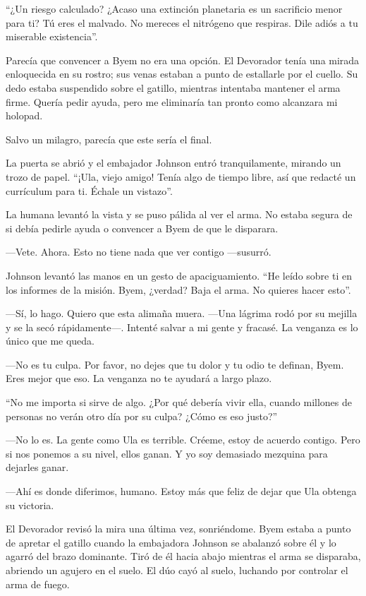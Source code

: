 ``¿Un riesgo calculado? ¿Acaso una extinción planetaria es un sacrificio menor para ti? Tú eres el malvado. No mereces el nitrógeno que respiras. Dile adiós a tu miserable existencia''.

Parecía que convencer a Byem no era una opción. El Devorador tenía una mirada enloquecida en su rostro; sus venas estaban a punto de estallarle por el cuello. Su dedo estaba suspendido sobre el gatillo, mientras intentaba mantener el arma firme. Quería pedir ayuda, pero me eliminaría tan pronto como alcanzara mi holopad.

Salvo un milagro, parecía que este sería el final.

La puerta se abrió y el embajador Johnson entró tranquilamente, mirando un trozo de papel. ``¡Ula, viejo amigo! Tenía algo de tiempo libre, así que redacté un currículum para ti. Échale un vistazo''.

La humana levantó la vista y se puso pálida al ver el arma. No estaba segura de si debía pedirle ayuda o convencer a Byem de que le disparara.

—Vete. Ahora. Esto no tiene nada que ver contigo —susurró.

Johnson levantó las manos en un gesto de apaciguamiento. ``He leído sobre ti en los informes de la misión. Byem, ¿verdad? Baja el arma. No quieres hacer esto''.

—Sí, lo hago. Quiero que esta alimaña muera. —Una lágrima rodó por su mejilla y se la secó rápidamente—. Intenté salvar a mi gente y fracasé. La venganza es lo único que me queda.

—No es tu culpa. Por favor, no dejes que tu dolor y tu odio te definan, Byem. Eres mejor que eso. La venganza no te ayudará a largo plazo.

``No me importa si sirve de algo. ¿Por qué debería vivir ella, cuando millones de personas no verán otro día por su culpa? ¿Cómo es eso justo?''

—No lo es. La gente como Ula es terrible. Créeme, estoy de acuerdo contigo. Pero si nos ponemos a su nivel, ellos ganan. Y yo soy demasiado mezquina para dejarles ganar.

—Ahí es donde diferimos, humano. Estoy más que feliz de dejar que Ula obtenga su victoria.

El Devorador revisó la mira una última vez, sonriéndome. Byem estaba a punto de apretar el gatillo cuando la embajadora Johnson se abalanzó sobre él y lo agarró del brazo dominante. Tiró de él hacia abajo mientras el arma se disparaba, abriendo un agujero en el suelo. El dúo cayó al suelo, luchando por controlar el arma de fuego.

